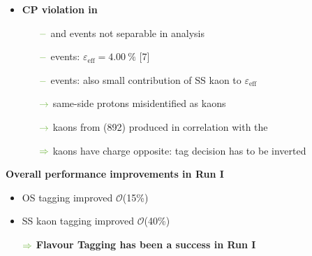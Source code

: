 {\begin{minipage}{0.474\boxwidth}
\begin{itemize}
\item\textbf{CP violation in \BsToJPsiKS}
	\begin{itemize}
	\setlength\itemsep{0.01em}
	\setlength{\itemindent}{-.11in}
	\item[${\color{tu_gruen}-}$] \Bs and \Bd events not separable in analysis
	\item[${\color{tu_gruen}-}$] \Bs events: $\varepsilon_\text{eff}=\SI{4.00}{\%}$ [7]
	\item[${\color{tu_gruen}-}$] \Bd events: also small contribution of SS kaon to $\varepsilon_\text{eff}$
	\setlength{\itemindent}{.05in}
	\item[${\color{tu_gruen}\rightarrow}$] same-side protons misidentified as kaons
	\item[${\color{tu_gruen}\rightarrow}$] kaons from \Kstar(892) produced in correlation with the \Bz
	\item[${\color{tu_gruen}\Rightarrow}$] kaons have charge opposite: tag decision has to be inverted
	\end{itemize}
%
%
\end{itemize}

\textbf{Overall performance improvements in Run I}
\begin{itemize}
\setlength\itemsep{0.01em}
\vspace{-0.3em}
\item OS tagging improved $\mathcal{O}$(15\%) 
\item SS kaon tagging improved $\mathcal{O}$(40\%)
\vspace{0.5em}
\setlength{\itemindent}{.14in}
\item[$\color{tu_gruen}\Rightarrow$] \textbf{Flavour Tagging has been a success in Run I}
\end{itemize}
\end{minipage}
\vspace{-0.5em}
}

